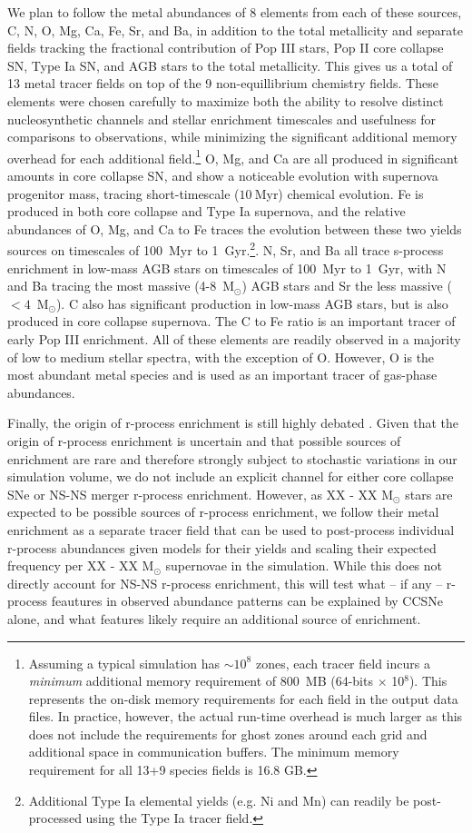 \documentclass[12pt]{article} %
\begin{document}
We plan to follow the metal abundances of 8 elements from each of these sources, C, N, O, Mg, Ca, Fe, Sr, and Ba, in addition to the total metallicity and separate fields tracking the fractional contribution of Pop III stars, Pop II core collapse SN, Type Ia SN, and AGB stars to the total metallicity. This gives us a total of 13 metal tracer fields on top of the 9 non-equillibrium chemistry fields. These elements were chosen carefully to maximize both the ability to resolve distinct nucleosynthetic channels and stellar enrichment timescales and usefulness for comparisons to observations, while minimizing the significant additional memory overhead for each additional field.\footnote{Assuming a typical simulation has $\sim10^8$ zones, each tracer field incurs a \textit{minimum} additional memory requirement of 800~MB  (64-bits $\times$ 10$^8$). This represents the on-disk memory requirements for each field in the output data files. In practice, however, the actual run-time overhead is much larger as this does not include the requirements for ghost zones around each grid and additional space in communication buffers. The minimum memory requirement for all 13+9 species fields is 16.8 GB.} O, Mg, and Ca are all produced in significant amounts in core collapse SN, and show a noticeable evolution with supernova progenitor mass, tracing short-timescale ($10~$Myr) chemical evolution. Fe is produced in both core collapse and Type Ia supernova, and the relative abundances of O, Mg, and Ca to Fe traces the evolution between these two yields sources on timescales of 100~Myr to 1~Gyr.\footnote{Additional Type Ia elemental yields (e.g. Ni and Mn) can readily be post-processed using the Type Ia tracer field.}. N, Sr, and Ba all trace s-process enrichment in low-mass AGB stars on timescales of 100~Myr to 1~Gyr, with N and Ba tracing the most massive (4-8~M$_{\odot}$) AGB stars and Sr the less massive ($<4$~M$_{\odot}$). C also has significant production in low-mass AGB stars, but is also produced in core collapse supernova. The C to Fe ratio is an important tracer of early Pop III enrichment. All of these elements are readily observed in a majority of low to medium stellar spectra, with the exception of O. However, O is the most abundant metal species and is used as an important tracer of gas-phase abundances.

Finally, the origin of r-process enrichment is still highly debated \citep[e.g.][]{}. Given that the origin of r-process enrichment is uncertain and that possible sources of enrichment are rare and therefore strongly subject to stochastic variations in our simulation volume, we do not include an explicit channel for either core collapse SNe or NS-NS merger r-process enrichment. However, as XX - XX M$_{\odot}$ stars are expected to be possible sources of r-process enrichment, we follow their metal enrichment as a separate tracer field that can be used to post-process individual r-process abundances given models for their yields and scaling their expected frequency per XX - XX M$_{\odot}$ supernovae in the simulation. While this does not directly account for NS-NS r-process enrichment, this will test what -- if any -- r-process feautures in observed abundance patterns can be explained by CCSNe alone, and what features likely require an additional source of enrichment.
\end{document}
